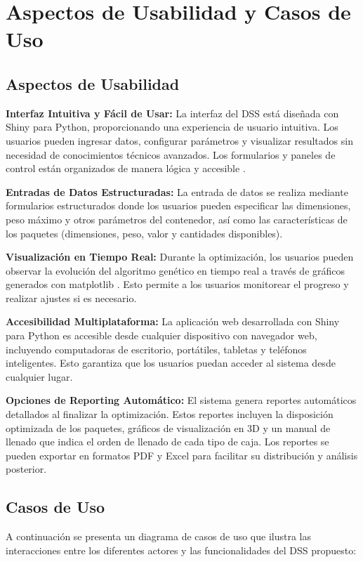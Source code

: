 \documentclass[9pt,a4paper]{rho}
\begin{document}
\section{Aspectos de Usabilidad y Casos de Uso}

\subsection{Aspectos de Usabilidad}
\textbf{Interfaz Intuitiva y Fácil de Usar:} La interfaz del DSS está diseñada con Shiny para Python, proporcionando una experiencia de usuario intuitiva. Los usuarios pueden ingresar datos, configurar parámetros y visualizar resultados sin necesidad de conocimientos técnicos avanzados. Los formularios y paneles de control están organizados de manera lógica y accesible \cite{shiny_intro}.

\textbf{Entradas de Datos Estructuradas:} La entrada de datos se realiza mediante formularios estructurados donde los usuarios pueden especificar las dimensiones, peso máximo y otros parámetros del contenedor, así como las características de los paquetes (dimensiones, peso, valor y cantidades disponibles).

\textbf{Visualización en Tiempo Real:} Durante la optimización, los usuarios pueden observar la evolución del algoritmo genético en tiempo real a través de gráficos generados con matplotlib \cite{matplotlib}. Esto permite a los usuarios monitorear el progreso y realizar ajustes si es necesario.

\textbf{Accesibilidad Multiplataforma:} La aplicación web desarrollada con Shiny para Python es accesible desde cualquier dispositivo con navegador web, incluyendo computadoras de escritorio, portátiles, tabletas y teléfonos inteligentes. Esto garantiza que los usuarios puedan acceder al sistema desde cualquier lugar.

\textbf{Opciones de Reporting Automático:} El sistema genera reportes automáticos detallados al finalizar la optimización. Estos reportes incluyen la disposición optimizada de los paquetes, gráficos de visualización en 3D y un manual de llenado que indica el orden de llenado de cada tipo de caja. Los reportes se pueden exportar en formatos PDF y Excel para facilitar su distribución y análisis posterior.

\subsection{Casos de Uso}
A continuación se presenta un diagrama de casos de uso que ilustra las interacciones entre los diferentes actores y las funcionalidades del DSS propuesto:
\end{document}
